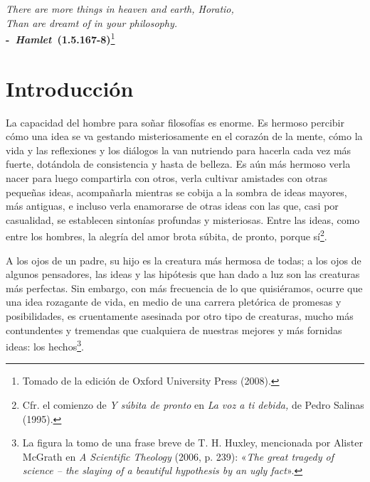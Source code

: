 
\begin{refsection}

\begin{flushright}
	\emph{There are more things in heaven and earth, Horatio,\\
		Than are dreamt of in your philosophy.}\\
	\textbf{-~\emph{Hamlet}~(1.5.167-8)}\footnote{Tomado de la edición de Oxford University Press (2008).}
\end{flushright}



\section*{Introducción}
\vspace{-1em}
La capacidad del hombre para soñar filosofías es enorme. Es hermoso percibir cómo una idea se va gestando misteriosamente en el corazón de la mente, cómo la vida y las reflexiones y los diálogos la van nutriendo para hacerla cada vez más fuerte, dotándola de consistencia y hasta de belleza. Es aún más hermoso verla nacer para luego compartirla con otros, verla cultivar amistades con otras pequeñas ideas, acompañarla mientras se cobija a la sombra de ideas mayores, más antiguas, e incluso verla enamorarse de otras ideas con las que, casi por casualidad, se establecen sintonías profundas y misteriosas. Entre las ideas, como entre los hombres, la alegría del amor brota súbita, de pronto, porque sí\footnote{Cfr. el comienzo de \emph{Y súbita de pronto} en \emph{La voz a ti debida,} de Pedro Salinas (1995).}.

A los ojos de un padre, su hijo es la creatura más hermosa de todas; a los ojos de algunos pensadores, las ideas y las hipótesis que han dado a luz son las creaturas más perfectas. Sin embargo, con más frecuencia de lo que quisiéramos, ocurre que una idea rozagante de vida, en medio de una carrera pletórica de promesas y posibilidades, es cruentamente asesinada por otro tipo de creaturas, mucho más contundentes y tremendas que cualquiera de nuestras mejores y más fornidas ideas: los hechos\footnote{La figura la tomo de una frase breve de T. H. Huxley, mencionada por Alister McGrath en \emph{A Scientific Theology} (2006, p. 239): «\emph{The great tragedy of science -- the slaying of a beautiful hypothesis by an ugly fact}».}.


\end{refsection}
